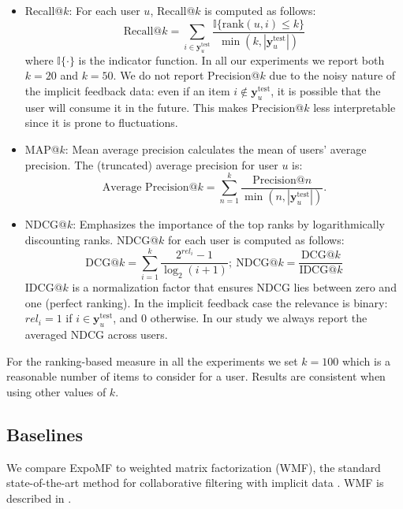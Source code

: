 \begin{itemize}
\item Recall@$k$: For each user $u$, Recall@$k$ is computed as follows:
\begin{displaymath}
\text{Recall@}k =\sum_{i\in\mathbf{y}^{\text{test}}_u} \frac{\mathbb{I}\{\text{rank}(u, i) \leq k\}}{\min(k, |\mathbf{y}_u^{\text{test}}|) }
\end{displaymath}
where $\mathbb{I}\{\cdot\}$ is the indicator function. In all our experiments we report both $k=20$ and $k=50$. We do not report Precision@$k$ due to the noisy nature of the implicit feedback data: even if an item $i\notin \mathbf{y}_u^{\text{test}}$, it is possible that the user will consume it in the future. This makes Precision@$k$ less interpretable since it is prone to fluctuations. 
\item MAP@$k$: Mean average precision calculates the mean of users' average precision. The (truncated) average precision for user $u$ is: 
\begin{displaymath}
  \text{Average Precision}@k = \sum_{n=1}^k \frac{\text{Precision}@n}{\min(n,|\mathbf{y}_u^{\text{test}}|)}.
\end{displaymath}
\item NDCG@$k$: Emphasizes the importance of the top ranks by logarithmically discounting ranks. NDCG@$k$ for each user is computed as follows:
\begin{displaymath}
\text{DCG}@k = \sum_{i=1}^k \frac{2^{rel_i} - 1}{\log_2(i + 1)}; ~ \text{NDCG}@k = \frac{\text{DCG}@k}{\text{IDCG}@k}
\end{displaymath}
IDCG$@k$ is a normalization factor that ensures NDCG lies between zero and one
(perfect ranking). In the implicit feedback case the relevance is binary:
$rel_i = 1$ if $i\in \mathbf{y}_u^{\text{test}}$, and 0 otherwise. In our
study we always report the averaged NDCG across users. 
\end{itemize}

For the ranking-based measure in all the experiments we set $k=100$ which
is a reasonable number of items to consider for a user. Results are
consistent when using other values of $k$. 
 

\subsection{Baselines}

We compare ExpoMF to weighted matrix factorization (WMF), the standard
state-of-the-art method for collaborative filtering with implicit data
\cite{hu2008collaborative}. WMF is described in .

